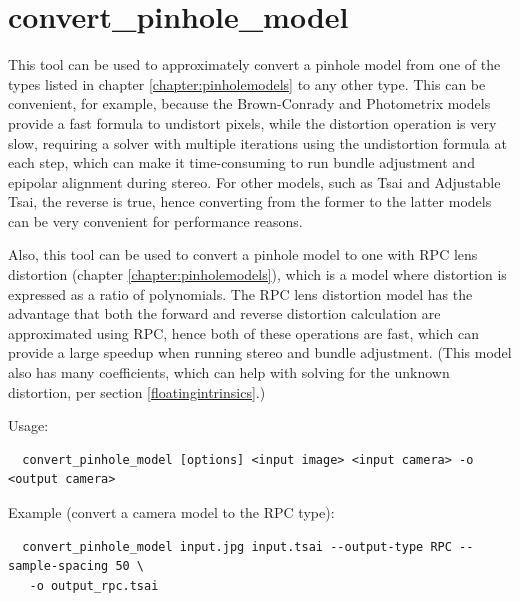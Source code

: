 \section{convert\_pinhole\_model}
\label{convertpinholemodel}

This tool can be used to approximately convert a pinhole model from one
of the types listed in chapter \ref{chapter:pinholemodels} to any other
type. This can be convenient, for example, because the Brown-Conrady and Photometrix models
provide a fast formula to undistort pixels, while the distortion operation is very slow,
requiring a solver with multiple iterations using the undistortion formula at each step,
which can make it time-consuming to run bundle adjustment and epipolar alignment during stereo.
For other models, such as Tsai and Adjustable Tsai, the reverse is true, hence converting
from the former to the latter models can be very convenient for performance reasons. 

Also, this tool can be used to convert a pinhole model to one with RPC
lens distortion (chapter \ref{chapter:pinholemodels}), which is a model
where distortion is expressed as a ratio of polynomials. The RPC lens
distortion model has the advantage that both the forward and reverse
distortion calculation are approximated using RPC, hence both of these
operations are fast, which can provide a large speedup when running
stereo and bundle adjustment. (This model also has many coefficients,
which can help with solving for the unknown distortion, per section
\ref{floatingintrinsics}.)

Usage:
\begin{verbatim}
  convert_pinhole_model [options] <input image> <input camera> -o <output camera>
\end{verbatim}

Example (convert a camera model to the RPC type):

\begin{verbatim}
  convert_pinhole_model input.jpg input.tsai --output-type RPC --sample-spacing 50 \
   -o output_rpc.tsai
\end{verbatim}

